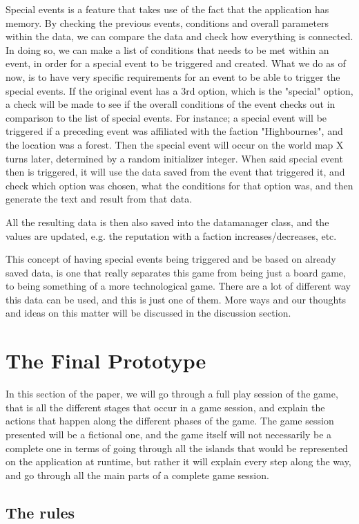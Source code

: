 Special events is a feature that takes use of the fact that the application has memory. By checking the previous events, conditions and overall parameters within the data, we can compare the data and check how everything is connected. In doing so, we can make a list of conditions that needs to be met within an event, in order for a special event to be triggered and created. What we do as of now, is to have very specific requirements for an event to be able to trigger the special events. If the original event has a 3rd option, which is the "special" option, a check will be made to see if the overall conditions of the event checks out in comparison to the list of special events.
For instance; a special event will be triggered if a preceding event was affiliated with the faction "Highbournes", and the location was a forest. Then the special event will occur on the world map X turns later, determined by a random initializer integer. When said special event then is triggered, it will use the data saved from the event that triggered it, and check which option was chosen, what the conditions for that option was, and then generate the text and result from that data.

All the resulting data is then also saved into the datamanager class, and the values are updated, e.g. the reputation with a faction increases/decreases, etc.


This concept of having special events being triggered and be based on already saved data, is one that really separates this game from being just a board game, to being something of a more technological game. There are a lot of different way this data can be used, and this is just one of them. More ways and our thoughts and ideas on this matter will be discussed in the discussion section.

\section{The Final Prototype}
In this section of the paper, we will go through a full play session of the game, that is all the different stages that occur in a game session, and explain the actions that happen along the different phases of the game.
The game session presented will be a fictional one, and the game itself will not necessarily be a complete one in terms of going through all the islands that would be represented on the application at runtime, but rather it will explain every step along the way, and go through all the main parts of a complete game session.
\subsection{The rules}
